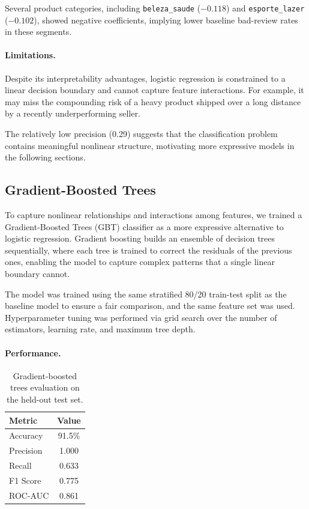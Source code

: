 \documentclass[11pt]{article}
\begin{document}
Several product categories, including \texttt{beleza\_saude} ($-0.118$) and \texttt{esporte\_lazer} ($-0.102$), showed negative coefficients, implying lower baseline bad-review rates in these segments.

\paragraph{Limitations.}

Despite its interpretability advantages, logistic regression is constrained to a linear decision boundary and cannot capture feature interactions. For example, it may miss the compounding risk of a heavy product shipped over a long distance by a recently underperforming seller.

The relatively low precision (0.29) suggests that the classification problem contains meaningful nonlinear structure, motivating more expressive models in the following sections.

\subsection{Gradient-Boosted Trees}
\label{sec:gbt}

To capture nonlinear relationships and interactions among features, we trained a Gradient-Boosted Trees (GBT) classifier as a more expressive alternative to logistic regression. Gradient boosting builds an ensemble of decision trees sequentially, where each tree is trained to correct the residuals of the previous ones, enabling the model to capture complex patterns that a single linear boundary cannot.

The model was trained using the same stratified 80/20 train-test split as the baseline model to ensure a fair comparison, and the same feature set was used. Hyperparameter tuning was performed via grid search over the number of estimators, learning rate, and maximum tree depth.

\paragraph{Performance.}

\begin{table}[H]
\centering
\caption{Gradient-boosted trees evaluation on the held-out test set.}
\label{tab:gbt_results}
\begin{tabular}{lc}
\toprule
Metric & Value \\
\midrule
Accuracy  & 91.5\% \\
Precision & 1.000  \\
Recall    & 0.633  \\
F1 Score  & 0.775  \\
ROC-AUC   & 0.861  \\
\bottomrule
\end{tabular}
\end{table}
\end{document}
